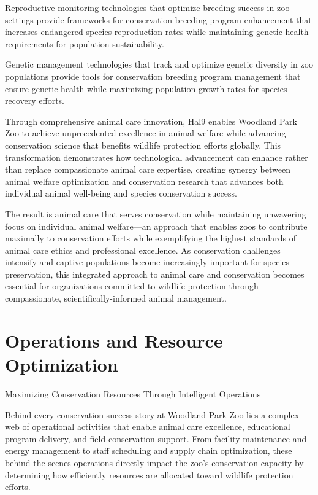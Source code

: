 \documentclass[
  Letterpaper,
]{scrbook}
\begin{document}
Reproductive monitoring technologies that optimize breeding success in
zoo settings provide frameworks for conservation breeding program
enhancement that increases endangered species reproduction rates while
maintaining genetic health requirements for population sustainability.

Genetic management technologies that track and optimize genetic
diversity in zoo populations provide tools for conservation breeding
program management that ensure genetic health while maximizing
population growth rates for species recovery efforts.

Through comprehensive animal care innovation, Hal9 enables Woodland Park
Zoo to achieve unprecedented excellence in animal welfare while
advancing conservation science that benefits wildlife protection efforts
globally. This transformation demonstrates how technological advancement
can enhance rather than replace compassionate animal care expertise,
creating synergy between animal welfare optimization and conservation
research that advances both individual animal well-being and species
conservation success.

The result is animal care that serves conservation while maintaining
unwavering focus on individual animal welfare---an approach that enables
zoos to contribute maximally to conservation efforts while exemplifying
the highest standards of animal care ethics and professional excellence.
As conservation challenges intensify and captive populations become
increasingly important for species preservation, this integrated
approach to animal care and conservation becomes essential for
organizations committed to wildlife protection through compassionate,
scientifically-informed animal management.


\chapter{Operations and Resource
Optimization}\label{operations-and-resource-optimization}

Maximizing Conservation Resources Through Intelligent Operations

\hfill\break

Behind every conservation success story at Woodland Park Zoo lies a
complex web of operational activities that enable animal care
excellence, educational program delivery, and field conservation
support. From facility maintenance and energy management to staff
scheduling and supply chain optimization, these behind-the-scenes
operations directly impact the zoo's conservation capacity by
determining how efficiently resources are allocated toward wildlife
protection efforts.
\end{document}
